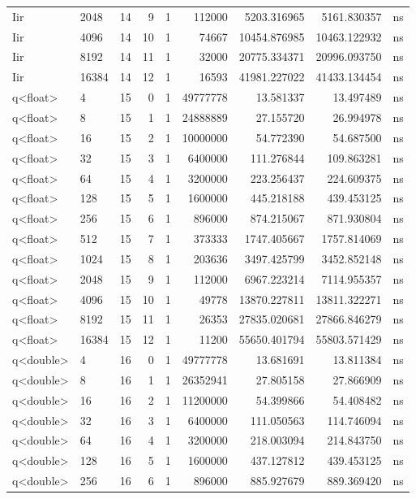 \begin{tabular}{llrrrrrrl}
Iir & 2048 & 14 & 9 & 1 & 112000 & 5203.316965 & 5161.830357 & ns \\
Iir & 4096 & 14 & 10 & 1 & 74667 & 10454.876985 & 10463.122932 & ns \\
Iir & 8192 & 14 & 11 & 1 & 32000 & 20775.334371 & 20996.093750 & ns \\
Iir & 16384 & 14 & 12 & 1 & 16593 & 41981.227022 & 41433.134454 & ns \\
q<float> & 4 & 15 & 0 & 1 & 49777778 & 13.581337 & 13.497489 & ns \\
q<float> & 8 & 15 & 1 & 1 & 24888889 & 27.155720 & 26.994978 & ns \\
q<float> & 16 & 15 & 2 & 1 & 10000000 & 54.772390 & 54.687500 & ns \\
q<float> & 32 & 15 & 3 & 1 & 6400000 & 111.276844 & 109.863281 & ns \\
q<float> & 64 & 15 & 4 & 1 & 3200000 & 223.256437 & 224.609375 & ns \\
q<float> & 128 & 15 & 5 & 1 & 1600000 & 445.218188 & 439.453125 & ns \\
q<float> & 256 & 15 & 6 & 1 & 896000 & 874.215067 & 871.930804 & ns \\
q<float> & 512 & 15 & 7 & 1 & 373333 & 1747.405667 & 1757.814069 & ns \\
q<float> & 1024 & 15 & 8 & 1 & 203636 & 3497.425799 & 3452.852148 & ns \\
q<float> & 2048 & 15 & 9 & 1 & 112000 & 6967.223214 & 7114.955357 & ns \\
q<float> & 4096 & 15 & 10 & 1 & 49778 & 13870.227811 & 13811.322271 & ns \\
q<float> & 8192 & 15 & 11 & 1 & 26353 & 27835.020681 & 27866.846279 & ns \\
q<float> & 16384 & 15 & 12 & 1 & 11200 & 55650.401794 & 55803.571429 & ns \\
q<double> & 4 & 16 & 0 & 1 & 49777778 & 13.681691 & 13.811384 & ns \\
q<double> & 8 & 16 & 1 & 1 & 26352941 & 27.805158 & 27.866909 & ns \\
q<double> & 16 & 16 & 2 & 1 & 11200000 & 54.399866 & 54.408482 & ns \\
q<double> & 32 & 16 & 3 & 1 & 6400000 & 111.050563 & 114.746094 & ns \\
q<double> & 64 & 16 & 4 & 1 & 3200000 & 218.003094 & 214.843750 & ns \\
q<double> & 128 & 16 & 5 & 1 & 1600000 & 437.127812 & 439.453125 & ns \\
q<double> & 256 & 16 & 6 & 1 & 896000 & 885.927679 & 889.369420 & ns \\

\end{tabular}
